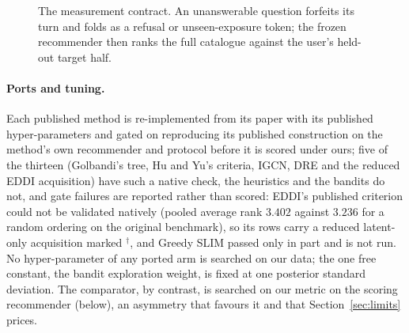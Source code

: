 \documentclass[runningheads]{llncs}
\begin{document}
\begin{figure}[tbp]
\centering
{}
\caption{The measurement contract. An unanswerable question forfeits its turn and folds as a refusal
or unseen-exposure token; the frozen recommender then ranks the full catalogue against the user's
held-out target half.}
\label{fig:contract}
\end{figure}

\paragraph{Ports and tuning.}
Each published method is re-implemented from its paper with its published hyper-parameters and
gated on reproducing its published construction on the method's own recommender and protocol before
it is scored under ours; five of the thirteen (Golbandi's tree, Hu and Yu's criteria, IGCN, DRE and
the reduced EDDI acquisition) have such a native check, the heuristics and the bandits do not, and gate
failures are reported rather than scored: EDDI's published criterion could not be validated natively
(pooled average rank $3.402$ against $3.236$ for a random ordering on the original benchmark), so its
rows carry a reduced latent-only acquisition marked $^\dagger$, and Greedy SLIM passed only in part
and is not run. No hyper-parameter of any ported arm is searched on our data; the one free constant,
the bandit exploration weight, is fixed at one posterior standard deviation. The comparator, by
contrast, is searched on our metric on the scoring recommender (below), an asymmetry that favours it
and that Section~\ref{sec:limits} prices.
\end{document}
